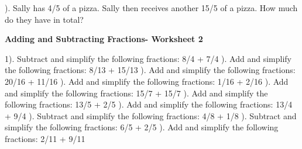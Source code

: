 \documentclass{article}%
\begin{document}
\newline%
). Sally has 4/5 of a pizza. Sally then receives another 15/5 of a pizza. How much do they have in total?%
\newline%
\newline%
\newline%
\pagebreak%
\large%
\begin{center}%
\textbf{Adding and Subtracting Fractions- Worksheet 2}%
\newline%
\end{center} \normalsize%
1). Subtract and simplify the following fractions: 8/4 + 7/4%
\newline%
\newline%
). Add and simplify the following fractions: 8/13 + 15/13%
\newline%
\newline%
). Add and simplify the following fractions: 20/16 + 11/16%
\newline%
\newline%
). Add and simplify the following fractions: 1/16 + 2/16%
\newline%
\newline%
). Add and simplify the following fractions: 15/7 + 15/7%
\newline%
\newline%
). Add and simplify the following fractions: 13/5 + 2/5%
\newline%
\newline%
). Add and simplify the following fractions: 13/4 + 9/4%
\newline%
\newline%
). Subtract and simplify the following fractions: 4/8 + 1/8%
\newline%
\newline%
). Subtract and simplify the following fractions: 6/5 + 2/5%
\newline%
\newline%
). Add and simplify the following fractions: 2/11 + 9/11%
\newline%
\end{document}
